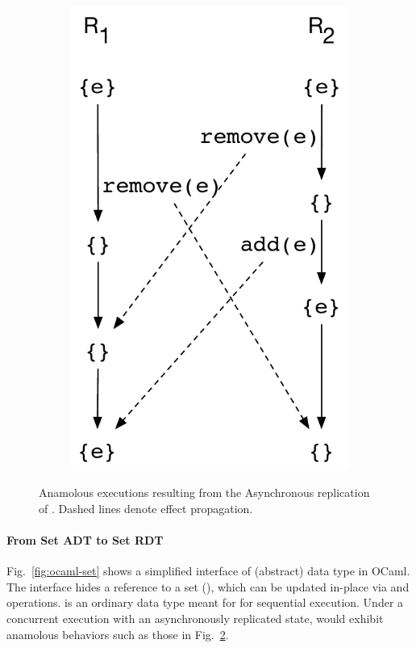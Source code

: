 \begin{figure}[ht]
\begin{subfigure}[t]{0.44\columnwidth}
    \includegraphics[scale=0.35]{Figures/crdt-execs-2}
    \caption{}
    \label{fig:crdt-exec-2}
  \end{subfigure}
\caption{Anamolous executions resulting from the Asynchronous
  replication of . Dashed lines denote effect propagation.}
\label{fig:crdt-execs}
\end{figure}

\noindent\paragraph{From Set ADT to Set RDT} Fig.~\ref{fig:ocaml-set}
shows a simplified interface of  (abstract) data type in OCaml.
The interface hides a reference to a set (), which can be
updated in-place via  and  operations.  is an
ordinary data type meant for for sequential execution. Under a
concurrent execution with an asynchronously replicated state, 
would exhibit anamolous behaviors such as those in
Fig.~\ref{fig:crdt-execs}.

